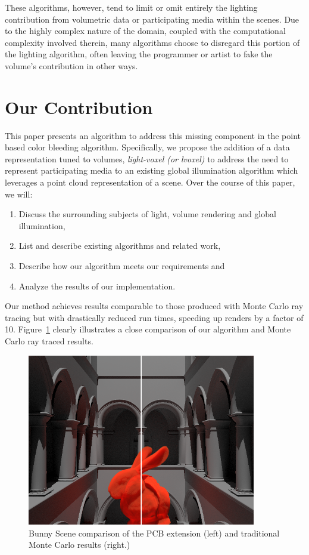 \documentclass[12pt]{ucthesis}
\begin{document}
These algorithms, however, tend to limit or omit entirely the lighting contribution from volumetric data or participating media within the scenes.  Due to the highly complex nature of the domain, coupled with the computational complexity involved therein, many algorithms choose to disregard this portion of the lighting algorithm, often leaving the programmer or artist to fake the volume's contribution in other ways.


\section{Our Contribution}

This paper presents an algorithm to address this missing component in the point based color bleeding algorithm.  Specifically, we propose the addition of a data representation tuned to volumes,  \emph{light-voxel (or lvoxel)} to address the need to represent participating media to an existing global illumination algorithm which leverages a point cloud representation of a scene.  Over the course of this paper, we will:

\begin{enumerate}
\item Discuss the surrounding subjects of light, volume rendering and global illumination,
\item List and describe existing algorithms and related work,
\item Describe how our algorithm meets our requirements and
\item Analyze the results of our implementation.
\end{enumerate}

Our method achieves results comparable to those produced with Monte Carlo ray tracing but with drastically reduced run times, speeding up renders by a factor of 10.  Figure~\ref{fig:compare} clearly illustrates a close comparison of our algorithm and Monte Carlo ray traced results.

\begin{figure}[h!]
    \centering
    \includegraphics[width=100mm]{img/compare.png}
    \caption{Bunny Scene comparison of the PCB extension (left) and traditional Monte Carlo results (right.)}
    \label{fig:compare}
\end{figure}
\end{document}
